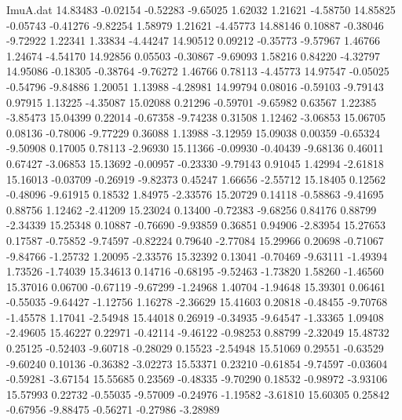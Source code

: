 \begin{filecontents}{ImuA.dat}
  14.83483   -0.02154   -0.52283   -9.65025    1.62032    1.21621   -4.58750
  14.85825   -0.05743   -0.41276   -9.82254    1.58979    1.21621   -4.45773
  14.88146    0.10887   -0.38046   -9.72922    1.22341    1.33834   -4.44247
  14.90512    0.09212   -0.35773   -9.57967    1.46766    1.24674   -4.54170
  14.92856    0.05503   -0.30867   -9.69093    1.58216    0.84220   -4.32797
  14.95086   -0.18305   -0.38764   -9.76272    1.46766    0.78113   -4.45773
  14.97547   -0.05025   -0.54796   -9.84886    1.20051    1.13988   -4.28981
  14.99794    0.08016   -0.59103   -9.79143    0.97915    1.13225   -4.35087
  15.02088    0.21296   -0.59701   -9.65982    0.63567    1.22385   -3.85473
  15.04399    0.22014   -0.67358   -9.74238    0.31508    1.12462   -3.06853
  15.06705    0.08136   -0.78006   -9.77229    0.36088    1.13988   -3.12959
  15.09038    0.00359   -0.65324   -9.50908    0.17005    0.78113   -2.96930
  15.11366   -0.09930   -0.40439   -9.68136    0.46011    0.67427   -3.06853
  15.13692   -0.00957   -0.23330   -9.79143    0.91045    1.42994   -2.61818
  15.16013   -0.03709   -0.26919   -9.82373    0.45247    1.66656   -2.55712
  15.18405    0.12562   -0.48096   -9.61915    0.18532    1.84975   -2.33576
  15.20729    0.14118   -0.58863   -9.41695    0.88756    1.12462   -2.41209
  15.23024    0.13400   -0.72383   -9.68256    0.84176    0.88799   -2.34339
  15.25348    0.10887   -0.76690   -9.93859    0.36851    0.94906   -2.83954
  15.27653    0.17587   -0.75852   -9.74597   -0.82224    0.79640   -2.77084
  15.29966    0.20698   -0.71067   -9.84766   -1.25732    1.20095   -2.33576
  15.32392    0.13041   -0.70469   -9.63111   -1.49394    1.73526   -1.74039
  15.34613    0.14716   -0.68195   -9.52463   -1.73820    1.58260   -1.46560
  15.37016    0.06700   -0.67119   -9.67299   -1.24968    1.40704   -1.94648
  15.39301    0.06461   -0.55035   -9.64427   -1.12756    1.16278   -2.36629
  15.41603    0.20818   -0.48455   -9.70768   -1.45578    1.17041   -2.54948
  15.44018    0.26919   -0.34935   -9.64547   -1.33365    1.09408   -2.49605
  15.46227    0.22971   -0.42114   -9.46122   -0.98253    0.88799   -2.32049
  15.48732    0.25125   -0.52403   -9.60718   -0.28029    0.15523   -2.54948
  15.51069    0.29551   -0.63529   -9.60240    0.10136   -0.36382   -3.02273
  15.53371    0.23210   -0.61854   -9.74597   -0.03604   -0.59281   -3.67154
  15.55685    0.23569   -0.48335   -9.70290    0.18532   -0.98972   -3.93106
  15.57993    0.22732   -0.55035   -9.57009   -0.24976   -1.19582   -3.61810
  15.60305    0.25842   -0.67956   -9.88475   -0.56271   -0.27986   -3.28989

\end{filecontents}
